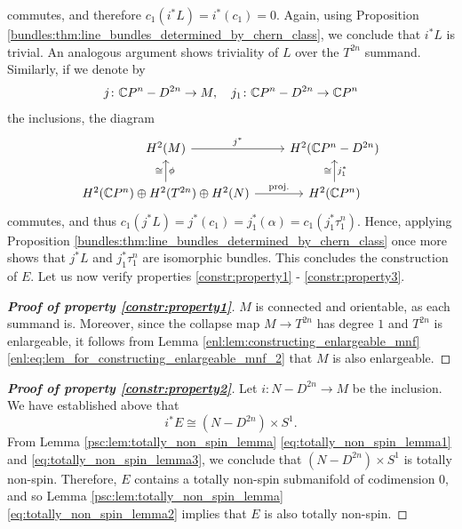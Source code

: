 commutes, and therefore $c_1(i^\ast L) =  i^\ast(c_1) = 0$. Again, using Proposition \ref{bundles:thm:line_bundles_determined_by_chern_class}, we conclude that $i^\ast L$ is trivial. An analogous argument shows triviality of $L$ over the $T^{2n}$ summand. Similarly, if we denote by 
\[
j \colon \mathbb{C} P^n - D^{2n} \to M, \quad j_1 \colon \mathbb{C} P^{n}-D^{2n} \to \mathbb{C} P^{n}
\]
the inclusions, the diagram
\[\begin{tikzcd}
	{H^2(M)} & {H^2(\CP^n - D^{2n}) } \\
	{H^2(\CP^n) \oplus H^2(T^{2n}) \oplus H^2(N)} & {H^2(\CP^n) }
	\arrow["{j^\ast}", from=1-1, to=1-2]
	\arrow["\cong", "\phi"',from=2-1, to=1-1]
	\arrow["{\mathrm{proj.}}", from=2-1, to=2-2]
	\arrow["\cong", "j_1^\ast"', from=2-2, to=1-2]
\end{tikzcd}\]
commutes, and thus $c_1(j^\ast L) = j^\ast(c_1) = j_1^\ast(\alpha) = c_1(j_1^\ast \tau_1^n)$. Hence, applying Proposition \ref{bundles:thm:line_bundles_determined_by_chern_class} once more shows that $j^\ast L$ and $j_1^\ast \tau_1^n$ are isomorphic bundles. This concludes the construction of $E$. Let us now verify properties \ref{constr:property1} - \ref{constr:property3}.

\begin{proof}[\normalfont\textbf{Proof of property \ref{constr:property1}}]
$M$ is connected and orientable, as each summand is. Moreover, since the collapse map $M \to T^{2n}$ has degree $1$ and $T^{2n}$ is enlargeable, it follows from Lemma \ref{enl:lem:constructing_enlargeable_mnf} \ref{enl:eq:lem_for_constructing_enlargeable_mnf_2} that $M$ is also enlargeable. 
\end{proof}

\begin{proof}[\normalfont\textbf{Proof of property \ref{constr:property2}}]
Let $i \colon N - D^{2n} \to M$ be the inclusion. We have established above that
\[
i^\ast E \cong (N- D^{2n}) \times S^1.
\]
From Lemma \ref{psc:lem:totally_non_spin_lemma} \ref{eq:totally_non_spin_lemma1} and \ref{eq:totally_non_spin_lemma3}, we conclude that $(N- D^{2n}) \times S^1$ is totally non-spin. Therefore, $E$ contains a totally non-spin submanifold of codimension $0$, and so Lemma \ref{psc:lem:totally_non_spin_lemma} \ref{eq:totally_non_spin_lemma2} implies that $E$ is also totally non-spin.
\end{proof}

